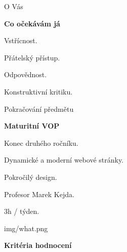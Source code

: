 \documentclass[aspectratio=169]{beamer}
\begin{document}
\begin{frame}{O Vás}
    \begin{cardTiny}
        \textbf{Co očekávám já}
    
        \begin{flushleft}
        Vstřícnost.

        Přátelský přístup.

        Odpovědnost.

        Konstruktivní kritiku.
        \end{flushleft}
    \end{cardTiny}
\end{frame}

\begin{frame}{Pokračování předmětu}
    \begin{cardTiny}
        \textbf{Maturitní VOP}

        Konec druhého ročníku.

        Dynamické a moderní webové stránky.

        Pokročilý design.

        Profesor Marek Kejda.

        3h / týden.
    \end{cardTiny}
\end{frame}

\begin{frameImg}[width]{img/what.png}
    \vspace*{60mm}
    \begin{cardTiny}
        \vspace*{\fill}
        \begin{center}
            \textbf{Kritéria hodnocení}
        \end{center}
    \end{cardTiny}
\end{frameImg}
\end{document}
